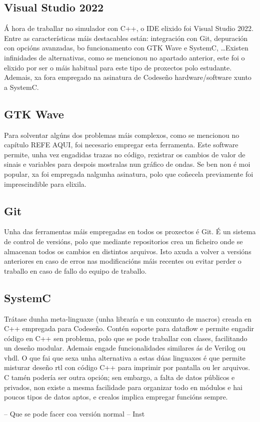 \subsection{Visual Studio 2022}\label{sec:visual_studio}
Á hora de traballar no simulador con C++, o IDE elixido foi Visual Studio 2022. Entre as características máis destacables están: integración con Git, depuración con opcións avanzadas, bo funcionamento con GTK Wave e SystemC, \dots Existen infinidades de alternativas, como se mencionou no apartado anterior, este foi o elixido por ser o máis habitual para este tipo de proxectos polo estudante. Ademais, xa fora empregado na asinatura de Codeseño \gls{hardware}/\gls{software} xunto a SystemC. 

\subsection{GTK Wave}\label{sec:gtkwave}
Para solventar algúns dos problemas máis complexos, como se mencionou no capítulo REFE AQUI, foi necesario empregar esta ferramenta. Este software permite, unha vez engadidas trazas no código, rexistrar os cambios de valor de sinais e variables para despois mostralas nun gráfico de ondas. Se ben non é moi popular, xa foi empregada nalgunha asinatura, polo que  coñecela previamente foi imprescindible para elixila.

\subsection{Git}\label{sec:git}
Unha das ferramentas máis empregadas en todos os proxectos é Git. É un sistema de control de versións, polo que mediante repositorios crea un ficheiro onde se almacenan todos os cambios en distintos arquivos. Isto axuda a volver a versións anteriores en caso de erros nas modificacións máis recentes ou evitar perder o traballo en caso de fallo do equipo de traballo.


\subsection{SystemC}\label{sec:systemc}
Trátase dunha meta-linguaxe (unha libraría e un conxunto de macros) creada en C++ empregada para Codeseño. Contén soporte para dataflow e permite engadir código en C++ sen problema, polo que se pode traballar con clases, facilitando un deseño modular. Ademais engade funcionalidades similares ás de Verilog ou \acrshort{vhdl}. O que fai que sexa unha alternativa a estas dúas linguaxes é que permite misturar deseño \acrshort{rtl} con código C++ para imprimir por pantalla ou ler arquivos. C tamén podería ser outra opción; sen embargo, a falta de datos públicos e privados, non existe a mesma facilidade para organizar todo en módulos e hai poucos tipos de datos aptos, e crealos implica empregar funcións sempre.


-- Que se pode facer coa versión normal
-- Inst


